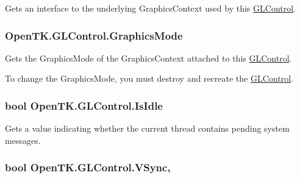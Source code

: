 Gets an interface to the underlying Graphics\-Context used by this \hyperlink{class_open_t_k_1_1_g_l_control}{G\-L\-Control}. 

\hypertarget{class_open_t_k_1_1_g_l_control_a09e08e21b3fd710f8b2b310441e414d4}{
\subsubsection[{Graphics\-Mode}]{ Open\-T\-K.\-G\-L\-Control.\-Graphics\-Mode\hspace{0.3cm}{\ttfamily [get]}}}\label{class_open_t_k_1_1_g_l_control_a09e08e21b3fd710f8b2b310441e414d4}


Gets the Graphics\-Mode of the Graphics\-Context attached to this \hyperlink{class_open_t_k_1_1_g_l_control}{G\-L\-Control}. 

To change the Graphics\-Mode, you must destroy and recreate the \hyperlink{class_open_t_k_1_1_g_l_control}{G\-L\-Control}. \hypertarget{class_open_t_k_1_1_g_l_control_a2d5bb8757e5df92cdd364693b0cc98bc}{
\subsubsection[{Is\-Idle}]{\setlength{\rightskip}{0pt plus 5cm}bool Open\-T\-K.\-G\-L\-Control.\-Is\-Idle\hspace{0.3cm}{\ttfamily [get]}}}\label{class_open_t_k_1_1_g_l_control_a2d5bb8757e5df92cdd364693b0cc98bc}


Gets a value indicating whether the current thread contains pending system messages. 

\hypertarget{class_open_t_k_1_1_g_l_control_a3dfbcb3e59d3644025432a73ee11f204}{
\subsubsection[{V\-Sync}]{\setlength{\rightskip}{0pt plus 5cm}bool Open\-T\-K.\-G\-L\-Control.\-V\-Sync\hspace{0.3cm}{\ttfamily [get]}, {\ttfamily [set]}}}\label{class_open_t_k_1_1_g_l_control_a3dfbcb3e59d3644025432a73ee11f204}


